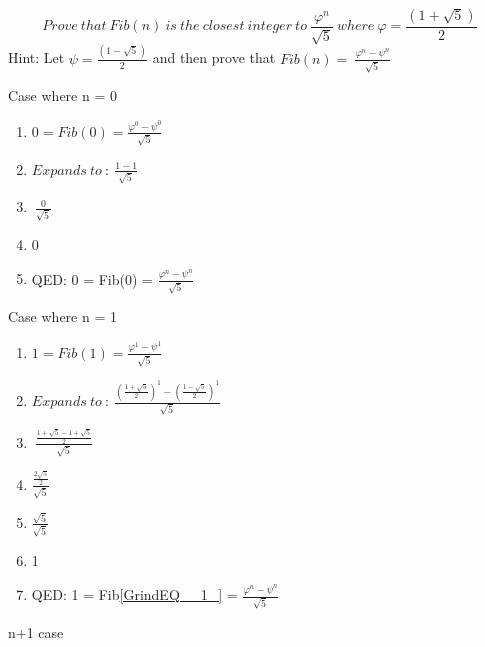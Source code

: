\documentclass{article} %
\begin{document}

\[Prove\ that\ Fib\left(n\right)\ is\ the\ closest\ integer\ to\ \frac{{\varphi }^n}{\sqrt{5}}\ where\ \varphi =\frac{(1+\sqrt{5})}{2}\] 
Hint: Let  $\psi =\frac{(1-\sqrt{5})}{2}$ and then prove that $Fib\left(n\right)=\ \frac{{\varphi }^n-{\psi }^n}{\sqrt{5}}$

\noindent 


\item  Case where n = 0

\begin{enumerate}
\item  $0=Fib\left(0\right)=\frac{{\varphi }^0-{\psi }^0}{\sqrt{5}}$

\item  $Expands\ to\ :\ \frac{1-1}{\sqrt{5}}\ $

\item  $\ \frac{0}{\sqrt{5}}$

\item  0

\item  QED: 0 = Fib(0) = $\frac{{\varphi }^n-{\psi }^n}{\sqrt{5}}$
\end{enumerate}


\noindent 


\item  Case where n = 1 

\begin{enumerate}
\item  $1=Fib\left(1\right)=\frac{{\varphi }^1-{\psi }^1}{\sqrt{5}}$

\item  $Expands\ to\ :\ \frac{{(\frac{1+\sqrt{5}}{2})}^1-{(\frac{1-\sqrt{5}}{2})}^1}{\sqrt{5}}\ $

\item  $\ \frac{\frac{1+\sqrt{5}-1+\sqrt{5}}{2}}{\sqrt{5}}$

\item  $\frac{\frac{2\sqrt{5}}{2}}{\sqrt{5}}$

\item  $\frac{\sqrt{5}}{\sqrt{5}}$

\item  1

\item  QED: 1 = Fib\eqref{GrindEQ__1_} = $\frac{{\varphi }^n-{\psi }^n}{\sqrt{5}}$
\end{enumerate}

\item  n+1 case
\end{document}
